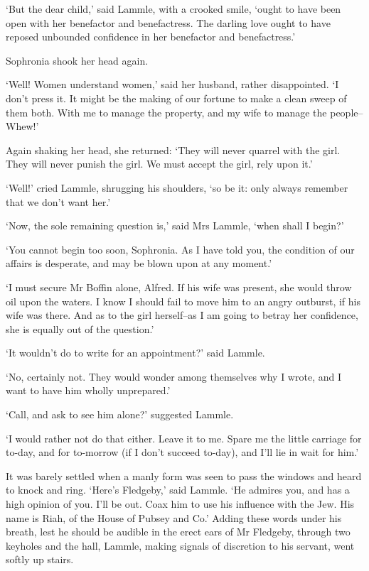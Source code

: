 ‘But the dear child,’ said Lammle, with a crooked smile, ‘ought to have
been open with her benefactor and benefactress. The darling love
ought to have reposed unbounded confidence in her benefactor and
benefactress.’

Sophronia shook her head again.

‘Well! Women understand women,’ said her husband, rather disappointed.
‘I don’t press it. It might be the making of our fortune to make a
clean sweep of them both. With me to manage the property, and my wife to
manage the people--Whew!’

Again shaking her head, she returned: ‘They will never quarrel with the
girl. They will never punish the girl. We must accept the girl, rely
upon it.’

‘Well!’ cried Lammle, shrugging his shoulders, ‘so be it: only always
remember that we don’t want her.’

‘Now, the sole remaining question is,’ said Mrs Lammle, ‘when shall I
begin?’

‘You cannot begin too soon, Sophronia. As I have told you, the condition
of our affairs is desperate, and may be blown upon at any moment.’

‘I must secure Mr Boffin alone, Alfred. If his wife was present, she
would throw oil upon the waters. I know I should fail to move him to an
angry outburst, if his wife was there. And as to the girl herself--as I
am going to betray her confidence, she is equally out of the question.’

‘It wouldn’t do to write for an appointment?’ said Lammle.

‘No, certainly not. They would wonder among themselves why I wrote, and
I want to have him wholly unprepared.’

‘Call, and ask to see him alone?’ suggested Lammle.

‘I would rather not do that either. Leave it to me. Spare me the little
carriage for to-day, and for to-morrow (if I don’t succeed to-day), and
I’ll lie in wait for him.’

It was barely settled when a manly form was seen to pass the windows
and heard to knock and ring. ‘Here’s Fledgeby,’ said Lammle. ‘He admires
you, and has a high opinion of you. I’ll be out. Coax him to use his
influence with the Jew. His name is Riah, of the House of Pubsey and
Co.’ Adding these words under his breath, lest he should be audible
in the erect ears of Mr Fledgeby, through two keyholes and the hall,
Lammle, making signals of discretion to his servant, went softly up
stairs.

